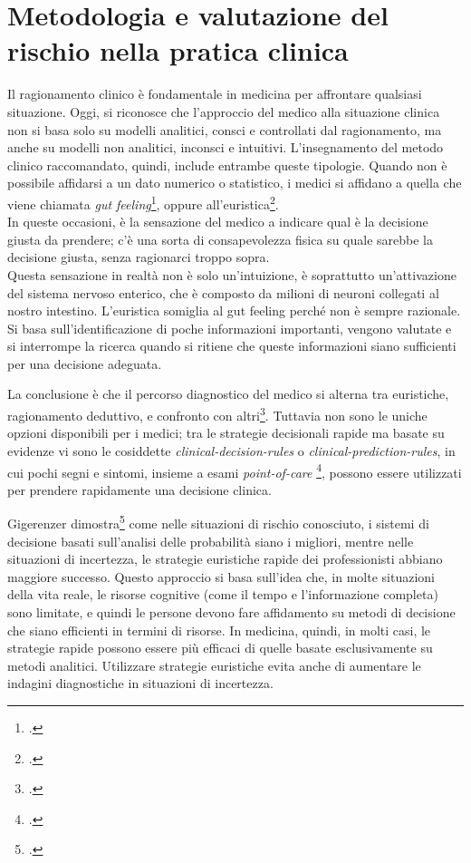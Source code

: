\section{Metodologia e valutazione del rischio nella pratica clinica}

Il ragionamento clinico è fondamentale in medicina per affrontare qualsiasi situazione. Oggi, si riconosce che l'approccio del medico alla situazione clinica non si basa solo su modelli analitici, consci e controllati dal ragionamento, ma anche su modelli non analitici, inconsci e intuitivi. L'insegnamento del metodo clinico raccomandato, quindi, include entrambe queste tipologie. Quando non è possibile affidarsi a un dato numerico o statistico, i medici si affidano a quella che viene chiamata \textit{gut feeling}\footcite{womak:arte-probabilita-coen}, oppure all'euristica\footcite{womak:recenti-progressi-medicina}.\\
In queste occasioni, è la sensazione del medico a indicare qual è la decisione giusta da prendere; c'è una sorta di consapevolezza fisica su quale sarebbe la decisione giusta, senza ragionarci troppo sopra.\\
Questa sensazione in realtà non è solo un'intuizione, è soprattutto un'attivazione del sistema nervoso enterico, che è composto da milioni di neuroni collegati al nostro intestino. L'euristica somiglia al gut feeling perché non è sempre razionale. Si basa sull'identificazione di poche informazioni importanti, vengono valutate e si interrompe la ricerca quando si ritiene che queste informazioni siano sufficienti per una decisione adeguata.

La conclusione è che il percorso diagnostico del medico si alterna tra euristiche, ragionamento deduttivo, e confronto con altri\footcite{womak:arte-probabilita-coen}. Tuttavia non sono le uniche opzioni disponibili per i medici; tra le strategie decisionali rapide ma basate su evidenze vi sono le cosiddette \textit{\gls{clinical-decision-rules}} o \textit{\gls{clinical-prediction-rules}}, in cui pochi segni e sintomi, insieme a esami \textit{\gls{point-of-care}} \footcite{womak:recenti-progressi-medicina}, possono essere utilizzati per prendere rapidamente una decisione clinica.

Gigerenzer dimostra\footcite{womak:gigerenzer-euristiche} come nelle situazioni di rischio conosciuto, i sistemi di decisione basati sull'analisi delle probabilità siano i migliori, mentre nelle situazioni di incertezza, le strategie euristiche rapide dei professionisti abbiano maggiore successo. Questo approccio si basa sull'idea che, in molte situazioni della vita reale, le risorse cognitive (come il tempo e l'informazione completa) sono limitate, e quindi le persone devono fare affidamento su metodi di decisione che siano efficienti in termini di risorse. In medicina, quindi, in molti casi, le strategie rapide possono essere più efficaci di quelle basate esclusivamente su metodi analitici. Utilizzare strategie euristiche evita anche di aumentare le indagini diagnostiche in situazioni di incertezza.\\

